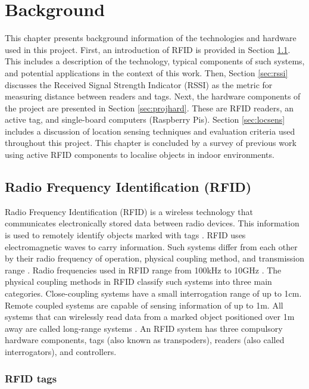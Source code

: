 \chapter{Background}
\label{ch:background}

This chapter presents background information of the technologies and hardware used in this project. First, an introduction of RFID is provided in Section \ref{sec:rfid}. This includes a description of the technology, typical components of such systems, and potential applications in the context of this work. Then, Section \ref{sec:rssi} discusses the Received Signal Strength Indicator (RSSI) as the metric for measuring distance between readers and tags. Next, the hardware components of the project are presented in Section \ref{sec:projhard}. These are RFID readers, an active tag, and single-board computers (Raspberry Pis). Section \ref{sec:locsens} includes a discussion of location sensing techniques and evaluation criteria used throughout this project. This chapter is concluded by a survey of previous work using active RFID components to localise objects in indoor environments.

\section{Radio Frequency Identification (RFID)}
\label{sec:rfid}

Radio Frequency Identification (RFID) is a wireless technology that communicates electronically stored data between radio devices. This information is used to remotely identify objects marked with tags \cite[p. 5]{Hunt2007}. RFID uses electromagnetic waves to carry information. Such systems differ from each other by their radio frequency of operation, physical coupling method, and transmission range \cite[p. 21]{Finkenzeller2010}. Radio frequencies used in RFID range from 100kHz to 10GHz \cite{Landt2005}. The physical coupling methods in RFID classify such systems into three main categories. Close-coupling systems have a small interrogation range of up to 1cm. Remote coupled systems are capable of sensing information of up to 1m. All systems that can wirelessly read data from a marked object positioned over 1m away are called long-range systems \cite[p. 22]{Finkenzeller2010}. An RFID system has three compulsory hardware components, tags (also known as transpoders), readers (also called interrogators), and controllers.

\subsection{RFID tags}

